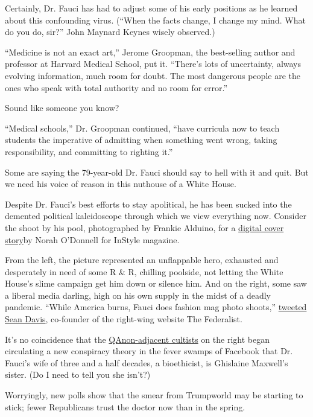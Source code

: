 Certainly, Dr. Fauci has had to adjust some of his early positions as he
learned about this confounding virus. (``When the facts change, I change
my mind. What do you do, sir?'' John Maynard Keynes wisely observed.)

``Medicine is not an exact art,'' Jerome Groopman, the best-selling
author and professor at Harvard Medical School, put it. ``There's lots
of uncertainty, always evolving information, much room for doubt. The
most dangerous people are the ones who speak with total authority and no
room for error.''

Sound like someone you know?

``Medical schools,'' Dr. Groopman continued, ``have curricula now to
teach students the imperative of admitting when something went wrong,
taking responsibility, and committing to righting it.''

Some are saying the 79-year-old Dr. Fauci should say to hell with it and
quit. But we need his voice of reason in this nuthouse of a White House.

Despite Dr. Fauci's best efforts to stay apolitical, he has been sucked
into the demented political kaleidoscope through which we view
everything now. Consider the shoot by his pool, photographed by Frankie
Alduino, for a
\href{https://www.instyle.com/news/dr-fauci-says-with-all-due-modesty-i-think-im-pretty-effective}{digital
cover story}by Norah O'Donnell for InStyle magazine.

From the left, the picture represented an unflappable hero, exhausted
and desperately in need of some R \& R, chilling poolside, not letting
the White House's slime campaign get him down or silence him. And on the
right, some saw a liberal media darling, high on his own supply in the
midst of a deadly pandemic. ``While America burns, Fauci does fashion
mag photo shoots,''
\href{https://twitter.com/seanmdav/status/1283602972426067971}{tweeted
Sean Davis}, co-founder of the right-wing website The Federalist.

It's no coincidence that the
\href{https://www.nytimes3xbfgragh.onion/2020/07/14/us/politics/qanon-politicians-candidates.html}{QAnon-adjacent
cultists} on the right began circulating a new conspiracy theory in the
fever swamps of Facebook that Dr. Fauci's wife of three and a half
decades, a bioethicist, is Ghislaine Maxwell's sister. (Do I need to
tell you she isn't?)

Worryingly, new polls show that the smear from Trumpworld may be
starting to stick; fewer Republicans trust the doctor now than in the
spring.

